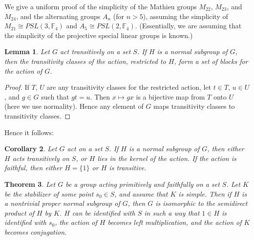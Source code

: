 \documentclass[12pt]{article}
\newtheorem{thm}{Theorem}
\newtheorem{lem}[thm]{Lemma}
\newtheorem{cor}[thm]{Corollary}
\begin{document}

We give a uniform proof of the simplicity of the Mathieu groups $M_{22}$, $M_{23}$, and $M_{24}$, and the alternating groups $A_n$ (for $n>5$), assuming the simplicity of $M_{21} \cong PSL(3,\mathbb{F}_4)$ and $A_5 \cong PSL(2,\mathbb{F}_4)$.  (Essentially, we are assuming that the simplicity of the projective special linear groups is known.)

\begin{lem}
Let $G$ act transitively on a set $S$.  If $H$ is a normal subgroup of $G$, then the transitivity classes of the action,
restricted to $H$, form a set of blocks for the action of $G$.
\end{lem}

\begin{proof}
If $T$, $U$ are any transitivity classes for the restricted action, let $t \in T$, $u \in U$, and $g \in G$ such
that $gt = u$.  Then $x \mapsto gx$ is a bijective map from $T$ onto $U$ (here we use normality).  Hence any element of $G$ maps transitivity classes to transitivity classes.
\end{proof}

Hence it follows:

\begin{cor}
Let $G$ act  on a set $S$.  If $H$ is a normal subgroup of $G$, then either $H$ acts transitively on $S$, or $H$ lies in the kernel of the action.  If the action is faithful, then either $H = \{1\}$ or $H$ is transitive.
\end{cor}

\begin{thm}
Let $G$ be a group acting primitively and faithfully on a set $S$.  Let $K$ be the stabilizer of some point $s_0 \in S$, and assume that $K$ is simple.  Then if $H$ is a nontrivial proper normal subgroup of $G$, then $G$ is isomorphic to the semidirect product of $H$ by $K$.  $H$ can be identified with $S$ in such a way that $1 \in H$ is identified with $s_0$, the action of $H$ becomes left multiplication, and the action of $K$ becomes conjugation.
\end{thm}
\end{document}
